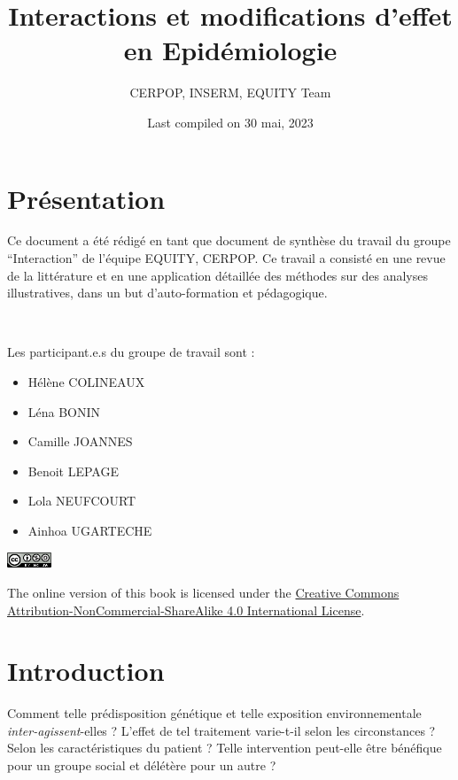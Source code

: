 \documentclass[
]{book}
\title{Interactions et modifications d'effet en Epidémiologie}
\author{CERPOP, INSERM, EQUITY Team}
\date{Last compiled on 30 mai, 2023}
\providecommand{\tightlist}{%
  \setlength{\itemsep}{0pt}\setlength{\parskip}{0pt}}
\begin{document}
\maketitle

{
\setcounter{tocdepth}{1}
\tableofcontents
}
\hypertarget{pruxe9sentation}{%
\chapter{Présentation}\label{pruxe9sentation}}

Ce document a été rédigé en tant que document de synthèse du travail du groupe ``Interaction'' de l'équipe EQUITY, CERPOP.
Ce travail a consisté en une revue de la littérature et en une application détaillée des méthodes sur des analyses illustratives, dans un but d'auto-formation et pédagogique.

\includegraphics[width=0\textwidth,height=\textheight]{img/Image0.png}

Les participant.e.s du groupe de travail sont :

\begin{itemize}
\tightlist
\item
  Hélène COLINEAUX\\
\item
  Léna BONIN
\item
  Camille JOANNES
\item
  Benoit LEPAGE
\item
  Lola NEUFCOURT
\item
  Ainhoa UGARTECHE
\end{itemize}

\includegraphics[width=0.1\textwidth,height=\textheight]{img/by-nc-sa.png}

The online version of this book is licensed under the \href{https://creativecommons.org/licenses/by-nc-sa/4.0/}{Creative Commons Attribution-NonCommercial-ShareAlike 4.0 International License}.

\hypertarget{introduction}{%
\chapter{Introduction}\label{introduction}}

Comment telle prédisposition génétique et telle exposition environnementale \emph{inter-agissent}-elles ? L'effet de tel traitement varie-t-il selon les circonstances ? Selon les caractéristiques du patient ? Telle intervention peut-elle être bénéfique pour un groupe social et délétère pour un autre ?
\end{document}
